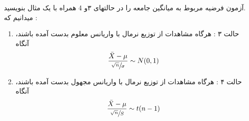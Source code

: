 \documentclass{KNED}
\begin{document}
\begin{exercise}
آزمون فرضیه مربوط به میانگین جامعه را در حالتهای ۳و 4 همراه
با یک مثال بنویسید.\\
میدانیم که : 
\begin{enumerate}
    \item  حالت ۳ : هرگاه مشاهدات از توزیع نرمال با واریانس معلوم بدست آمده باشند، آنگاه
    \[
        \frac{\Bar{X} - \mu }{\sfrac{\sqrt{n}}{\sigma}} \sim N(0, 1)
    \]
    \item حالت ۴ : هرگاه مشاهدات از توزیع نرمال با واریانس مجهول بدست آمده باشند، آنگاه
    \[
        \frac{\Bar{X} - \mu }{\sfrac{\sqrt{n}}{S}} \sim t(n-1)
    \]

\end{enumerate}

\end{exercise}
\end{document}
